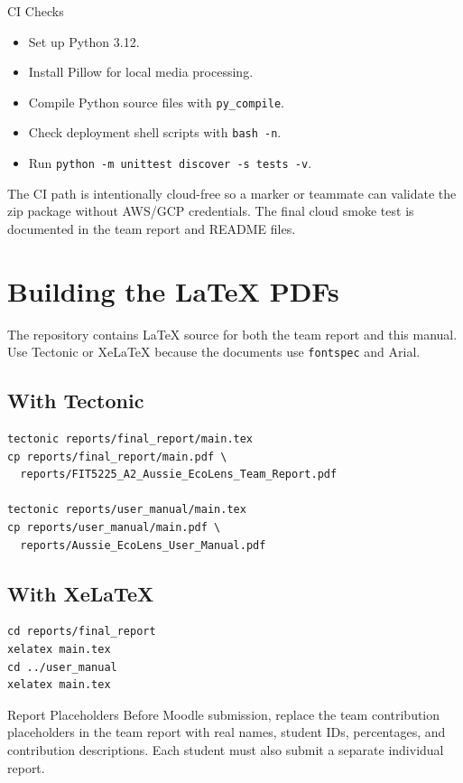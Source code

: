 \documentclass[12pt,a4paper]{article}
\begin{document}
\begin{manualbox}{CI Checks}
\begin{itemize}
  \item Set up Python 3.12.
  \item Install Pillow for local media processing.
  \item Compile Python source files with \texttt{py\_compile}.
  \item Check deployment shell scripts with \texttt{bash -n}.
  \item Run \texttt{python -m unittest discover -s tests -v}.
\end{itemize}
\end{manualbox}

The CI path is intentionally cloud-free so a marker or teammate can validate the zip package without AWS/GCP credentials. The final cloud smoke test is documented in the team report and README files.

\section{Building the LaTeX PDFs}
The repository contains LaTeX source for both the team report and this manual. Use Tectonic or XeLaTeX because the documents use \texttt{fontspec} and Arial.

\subsection{With Tectonic}
\begin{verbatim}
tectonic reports/final_report/main.tex
cp reports/final_report/main.pdf \
  reports/FIT5225_A2_Aussie_EcoLens_Team_Report.pdf

tectonic reports/user_manual/main.tex
cp reports/user_manual/main.pdf \
  reports/Aussie_EcoLens_User_Manual.pdf
\end{verbatim}

\subsection{With XeLaTeX}
\begin{verbatim}
cd reports/final_report
xelatex main.tex
cd ../user_manual
xelatex main.tex
\end{verbatim}

\begin{manualbox}{Report Placeholders}
Before Moodle submission, replace the team contribution placeholders in the team report with real names, student IDs, percentages, and contribution descriptions. Each student must also submit a separate individual report.
\end{manualbox}
\end{document}
